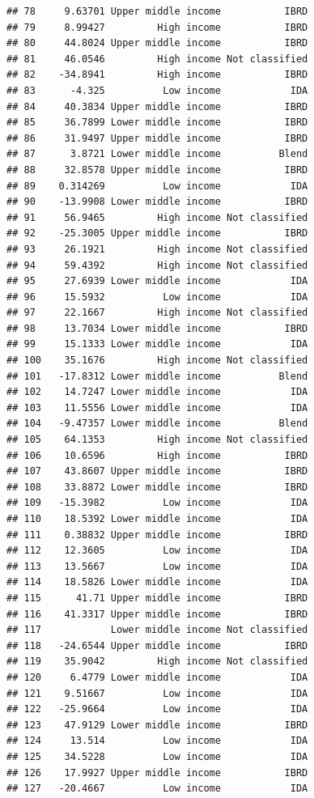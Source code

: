 \documentclass[
]{article}
\begin{document}
\begin{verbatim}
## 78     9.63701 Upper middle income           IBRD
## 79     8.99427         High income           IBRD
## 80     44.8024 Upper middle income           IBRD
## 81     46.0546         High income Not classified
## 82    -34.8941         High income           IBRD
## 83      -4.325          Low income            IDA
## 84     40.3834 Upper middle income           IBRD
## 85     36.7899 Lower middle income           IBRD
## 86     31.9497 Upper middle income           IBRD
## 87      3.8721 Lower middle income          Blend
## 88     32.8578 Upper middle income           IBRD
## 89    0.314269          Low income            IDA
## 90    -13.9908 Lower middle income           IBRD
## 91     56.9465         High income Not classified
## 92    -25.3005 Upper middle income           IBRD
## 93     26.1921         High income Not classified
## 94     59.4392         High income Not classified
## 95     27.6939 Lower middle income            IDA
## 96     15.5932          Low income            IDA
## 97     22.1667         High income Not classified
## 98     13.7034 Lower middle income           IBRD
## 99     15.1333 Lower middle income            IDA
## 100    35.1676         High income Not classified
## 101   -17.8312 Lower middle income          Blend
## 102    14.7247 Lower middle income            IDA
## 103    11.5556 Lower middle income            IDA
## 104   -9.47357 Lower middle income          Blend
## 105    64.1353         High income Not classified
## 106    10.6596         High income           IBRD
## 107    43.8607 Upper middle income           IBRD
## 108    33.8872 Lower middle income           IBRD
## 109   -15.3982          Low income            IDA
## 110    18.5392 Lower middle income            IDA
## 111    0.38832 Upper middle income           IBRD
## 112    12.3605          Low income            IDA
## 113    13.5667          Low income            IDA
## 114    18.5826 Lower middle income            IDA
## 115      41.71 Upper middle income           IBRD
## 116    41.3317 Upper middle income           IBRD
## 117            Lower middle income Not classified
## 118   -24.6544 Upper middle income           IBRD
## 119    35.9042         High income Not classified
## 120     6.4779 Lower middle income            IDA
## 121    9.51667          Low income            IDA
## 122   -25.9664          Low income            IDA
## 123    47.9129 Lower middle income           IBRD
## 124     13.514          Low income            IDA
## 125    34.5228          Low income            IDA
## 126    17.9927 Upper middle income           IBRD
## 127   -20.4667          Low income            IDA

\end{verbatim}
\end{document}
